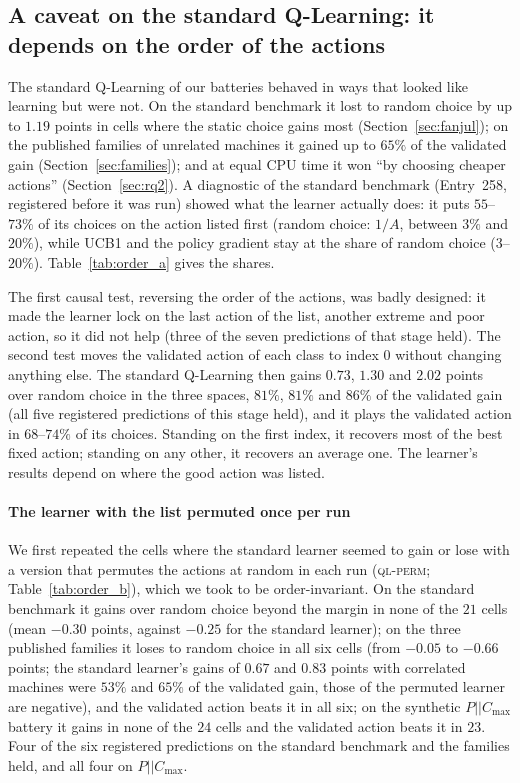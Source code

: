 \subsection{A caveat on the standard Q-Learning: it depends on the order of the actions}
\label{sec:order}
The standard Q-Learning of our batteries behaved in ways that looked like learning but were not. On the standard benchmark it lost to random choice by up to $1.19$ points in cells where the static choice gains most (Section~\ref{sec:fanjul}); on the published families of unrelated machines it gained up to $65\%$ of the validated gain (Section~\ref{sec:families}); and at equal CPU time it won ``by choosing cheaper actions'' (Section~\ref{sec:rq2}). A diagnostic of the standard benchmark (Entry~258, registered before it was run) showed what the learner actually does: it puts $55$--$73\%$ of its choices on the action listed first (random choice: $1/A$, between $3\%$ and $20\%$), while UCB1 and the policy gradient stay at the share of random choice ($3$--$20\%$). Table~\ref{tab:order_a} gives the shares.



The first causal test, reversing the order of the actions, was badly designed: it made the learner lock on the last action of the list, another extreme and poor action, so it did not help (three of the seven predictions of that stage held). The second test moves the validated action of each class to index $0$ without changing anything else. The standard Q-Learning then gains $0.73$, $1.30$ and $2.02$ points over random choice in the three spaces, $81\%$, $81\%$ and $86\%$ of the validated gain (all five registered predictions of this stage held), and it plays the validated action in $68$--$74\%$ of its choices. Standing on the first index, it recovers most of the best fixed action; standing on any other, it recovers an average one. The learner's results depend on where the good action was listed.

\paragraph{The learner with the list permuted once per run} We first repeated the cells where the standard learner seemed to gain or lose with a version that permutes the actions at random in each run (\textsc{ql-perm}; Table~\ref{tab:order_b}), which we took to be order-invariant. On the standard benchmark it gains over random choice beyond the margin in none of the $21$ cells (mean $-0.30$ points, against $-0.25$ for the standard learner); on the three published families it loses to random choice in all six cells (from $-0.05$ to $-0.66$ points; the standard learner's gains of $0.67$ and $0.83$ points with correlated machines were $53\%$ and $65\%$ of the validated gain, those of the permuted learner are negative), and the validated action beats it in all six; on the synthetic $P||C_{\max}$ battery it gains in none of the $24$ cells and the validated action beats it in $23$. Four of the six registered predictions on the standard benchmark and the families held, and all four on $P||C_{\max}$.

